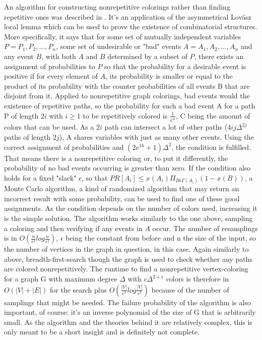 \documentclass[12pt,a4paper]{article}
\begin{document}
\newline
An algorithm for constructing nonrepetitive colorings rather than finding repetitive ones was described in \citep{Haeupler2010}. It's an application of the asymmetrical Lovász local lemma which can be used to prove the existence of combinatorial structures. More specifically, it says that for some set of mutually independent variables $P = {P_1, P_2, ..., P_n}$, some set of undesirable or "bad" events $A = {A_1, A_2, ..., A_n}$ and any event $B$, with both $A$ and $B$ determined by a subset of $P$, there exists an assignment of probabilities to $P$ so that the probability for a desirable event is positive if for every element of $A$, its probability is smaller or equal to the product of its probability with the counter probabilities of all events B that are disjoint from it. Applied to nonrepetitive graph colorings, bad events would the existence of repetitive paths, so the probability for such a bad event A for a path P of length $2i$ with $i \geq 1$ to be repetitively colored is $\frac{1}{C^i}$, C being the amount of colors that can be used. As a $2i$ path can intersect a lot of other paths ($4ij\Delta^{2j}$ paths of length $2j$), A shares variables with just as many other events. Using the correct assignment of probabilities and $(2e^{16}+1)\Delta^2$, the condition is fulfilled. That means there is a nonrepetitive coloring or, to put it differently, the probability of no bad events occurring is greater than zero. If the condition also holds for a fixed "slack" $\epsilon$, so that $PR[A_i] \leq x(A_i) \Pi_{B \epsilon \Gamma(A_i)} (1-x(B))$, a Monte Carlo algorithm, a kind of randomized algorithm that may return an incorrect result with some probability, can be used to find one of these good assignments. As the condition depends on the number of colors used, increasing it is the simple solution. The algorithm works similarly to the one above, sampling a coloring and then verifying if any events in $A$ occur. The number of resamplings is in $O(\frac{n}{\epsilon^2}log\frac{n}{\epsilon^2})$, $\epsilon$ being the constant from before and n the size of the input, so the number of vertices in the graph in question, in this case. Again similarly to above, breadth-first-search though the graph is used to check whether any paths are colored nonrepetitively. The runtime to find a nonrepetitive vertex-coloring for a graph G with maximum degree $\Delta$ with $c\Delta^{2+\epsilon}$ colors is therefore in $O(|V|+|E|)$ for the search plus $O(\frac{|V|}{\epsilon^2}log\frac{|V|}{\epsilon^2})$ because of the number of samplings that might be needed. The failure probability of the algorithm is also important, of course: it's an inverse polynomial of the size of G that is arbitrarily small. As the algorithm and the theories behind it are relatively complex, this is only meant to be a short insight and is definitely not complete.
\end{document}
